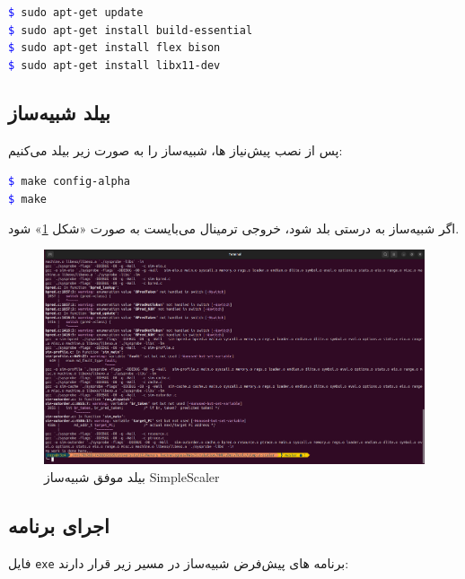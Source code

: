 \documentclass[12pt]{exam}
\begin{document}
\begin{questions}
\begin{latin}
	\texttt{\textcolor{blue}{\$} sudo apt-get update} \\
	\texttt{\textcolor{blue}{\$} sudo apt-get install build-essential} \\
	\texttt{\textcolor{blue}{\$} sudo apt-get install flex bison} \\
	\texttt{\textcolor{blue}{\$} sudo apt-get install libx11-dev} \\
\end{latin}


\subsection{بیلد شبیه‌ساز}
 پس از نصب پیش‌نیاز ها، شبیه‌ساز را به صورت زیر بیلد می‌کنیم: \\
 
 \begin{latin}
 	\texttt{\textcolor{blue}{\$} make config-alpha} \\
 	\texttt{\textcolor{blue}{\$} make} \\
 \end{latin}
 
 اگر شبیه‌ساز به درستی بلد شود، خروجی ترمینال می‌بایست به صورت «شکل \textcolor{blue}{\ref{بیلد موفق شبیه‌ساز SimpleScaler}}» شود.
 
 \begin{figure}[h]
 	\centering
 	\includegraphics[width=1\textwidth]{images/img17}
 	\caption{بیلد موفق شبیه‌ساز SimpleScaler}
 	\label{بیلد موفق شبیه‌ساز SimpleScaler}
 \end{figure}
 
 
 \subsection{اجرای برنامه}
 فایل \texttt{exe} برنامه های پیش‌فرض شبیه‌ساز در مسیر زیر قرار دارند:
 

\end{questions}
\end{document}

